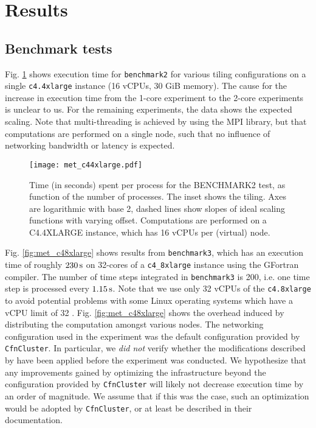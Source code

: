 \documentclass[12pt,a4paper]{article}
\begin{document}
\section{Results}

\subsection{Benchmark tests}

Fig. \ref{fig:met_c44xlarge} shows execution time for \verb|benchmark2| for various tiling configurations on a single \verb|c4.4xlarge| instance (16	vCPUs, 30 GiB memory).  The cause for the increase in execution time from the 1-core experiment to the 2-core experiments is unclear to us. For the remaining experiments, the data shows the expected scaling. Note that multi-threading is achieved by using the MPI library, but that computations are performed on a single node, such that no influence of networking bandwidth or latency is expected.

\begin{figure}[H]
	\centering
	\texttt{[image: met\_c44xlarge.pdf]}
	\caption{Time (in seconds) spent per process for the BENCHMARK2 test, as function of the number of processes. The inset shows the tiling. Axes are logarithmic with base 2, dashed lines show slopes of ideal scaling functions with varying offset. Computations are performed on a C4.4XLARGE instance, which has 16 vCPUs per (virtual) node.}
	\label{fig:met_c44xlarge}
\end{figure}

Fig. \ref{fig:met_c48xlarge} shows results from \verb|benchmark3|, which has an execution time of roughly $230\,\rm s$ on 32-cores of a \verb|c4_8xlarge| instance using the GFortran compiler. The number of time steps integrated in  \verb|benchmark3| is 200, i.e. one time step is processed every $1.15\,\rm s $. Note that we use only 32 vCPUs of the \verb|c4.8xlarge| to avoid potential problems with some Linux operating systems which have a vCPU limit of 32 \citep{web:ec2_c4}. 
Fig. \ref{fig:met_c48xlarge} shows the overhead induced by distributing the computation amongst various nodes. The networking configuration used in the experiment was the default configuration provided by \verb|CfnCluster|. In particular, we \emph{did not} verify whether the modifications described by \cite{web:cyclempi} \citep[see also][]{web:ibmMpiTrick} have been applied before the experiment was conducted. We hypothesize that any improvements gained by optimizing the infrastructure beyond the configuration provided by \verb|CfnCluster| will likely not decrease execution time by an order of magnitude. We assume that if this was the case, such an optimization would be adopted by \verb|CfnCluster|, or at least be described in their documentation.
\end{document}

